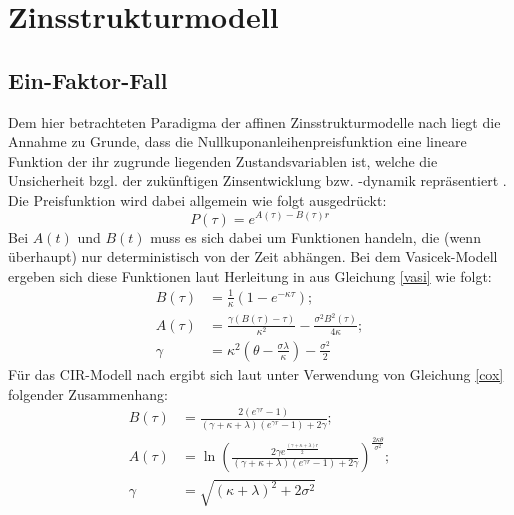 \documentclass[12pt,a4paper,headsepline,bibliography=totoc,listof=totoc,headinclude=false,footinclude=false,BCOR5mm]{scrreprt} %
\begin{document}
\section{Zinsstrukturmodell}
\subsection{Ein-Faktor-Fall}

Dem hier betrachteten Paradigma der affinen Zinsstrukturmodelle nach \cite{Duffie1996} liegt die Annahme zu Grunde, dass die Nullkuponanleihenpreisfunktion eine lineare Funktion der ihr zugrunde liegenden Zustandsvariablen ist, welche die Unsicherheit bzgl. der zuk{\"u}nftigen Zinsentwicklung bzw. -dynamik repr{\"a}sentiert \cite[S. 4]{Bolder2001}. Die Preisfunktion wird dabei allgemein wie folgt ausgedr{\"u}ckt: \begin{equation}\label{affin}
P(\tau) = e^{A(\tau)-B(\tau)r}
 \end{equation} Bei $A(t)$ und $B(t)$ muss es sich dabei um Funktionen handeln, die (wenn {\"u}berhaupt) nur deterministisch von der Zeit abh{\"a}ngen. Bei dem Vasicek-Modell \cite{Vasicek1977} ergeben sich diese Funktionen laut Herleitung in \cite[S. 16ff]{Bolder2001} aus Gleichung \ref{vasi} wie folgt:
\begin{equation}\label{affinvasi}\begin{split}
 B(\tau) &= \frac{1}{\kappa} (1- e^{-\kappa\tau}); \\  A(\tau) & = \frac{\gamma(B(\tau)-\tau)}{\kappa^2} - \frac{\sigma^2B^2(\tau)}{4\kappa}; \\  \gamma & =\kappa^2\left(\theta - \frac{\sigma\lambda}{\kappa}\right) - \frac{\sigma^2}{2}
\end{split} \end{equation}
F{\"u}r das CIR-Modell nach \cite{Cox1985} ergibt sich laut \cite[S. 42ff]{Bolder2001} unter Verwendung von Gleichung \ref{cox} folgender Zusammenhang:
\begin{equation}\label{affinCIR}\begin{split}
 B(\tau) & = \frac{2(e^{\gamma r}-1)}{(\gamma + \kappa + \lambda)(e^{\gamma r}-1)+2\gamma};\\ A(\tau) & =\ln\left(\frac{2\gamma e^{\frac{(\gamma + \kappa + \lambda)r}{2}} }{(\gamma + \kappa + \lambda)(e^{\gamma r}-1)+2\gamma} \right)^{\frac{2\kappa\theta}{\sigma^{2}}}; \\  \gamma & =\sqrt{(\kappa + \lambda)^{2}+2\sigma^{2}}
\end{split} \end{equation}
\end{document}
